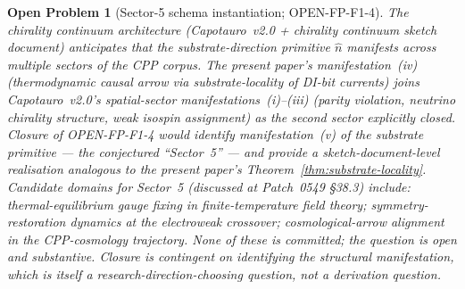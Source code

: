 \documentclass[11pt,letterpaper]{article}
\newtheorem{openproblem}{Open Problem}
\begin{document}
\begin{openproblem}[Sector-5 schema instantiation; OPEN-FP-F1-4]
\label{op:sector5-schema}
The chirality continuum architecture (Capotauro~v2.0 + chirality continuum sketch document) anticipates that the substrate-direction primitive $\hat{n}$ manifests across multiple sectors of the CPP corpus. The present paper's manifestation~(iv) (thermodynamic causal arrow via substrate-locality of DI-bit currents) joins Capotauro~v2.0's spatial-sector manifestations~(i)--(iii) (parity violation, neutrino chirality structure, weak isospin assignment) as the second sector explicitly closed. Closure of OPEN-FP-F1-4 would identify manifestation~(v) of the substrate primitive --- the conjectured ``Sector~5'' --- and provide a sketch-document-level realisation analogous to the present paper's Theorem~\ref{thm:substrate-locality}. Candidate domains for Sector~5 (discussed at Patch~0549 \S38.3) include: thermal-equilibrium gauge fixing in finite-temperature field theory; symmetry-restoration dynamics at the electroweak crossover; cosmological-arrow alignment in the CPP-cosmology trajectory. None of these is committed; the question is open and substantive. Closure is contingent on identifying the structural manifestation, which is itself a research-direction-choosing question, not a derivation question.
\end{openproblem}
\end{document}
